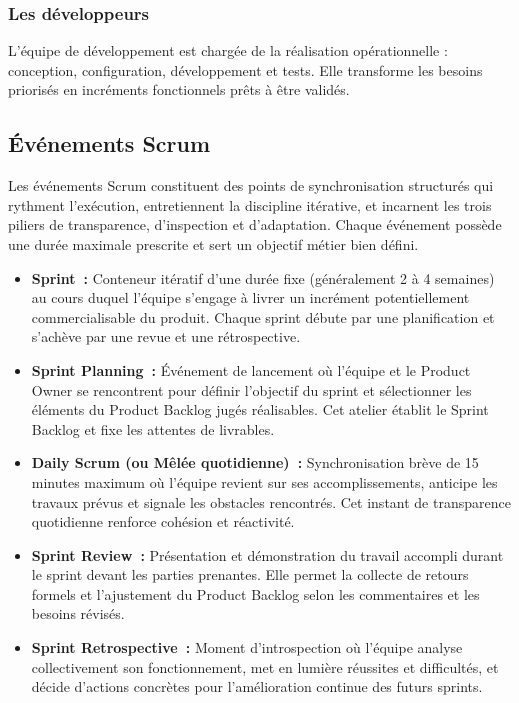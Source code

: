 \subsubsection{Les développeurs}
L’équipe de développement est chargée de la réalisation opérationnelle : conception, configuration,
développement et tests. Elle transforme les besoins priorisés en incréments fonctionnels prêts à être validés.

\subsection{Événements Scrum}
Les événements Scrum constituent des points de synchronisation structurés qui rythment l'exécution, entretiennent la discipline itérative, et incarnent les trois piliers de transparence, d'inspection et d'adaptation. Chaque événement possède une durée maximale prescrite et sert un objectif métier bien défini.
\begin{itemize}[nosep, left=0pt, label=\textbullet]
\item \textbf{Sprint~:} Conteneur itératif d'une durée fixe (généralement 2 à 4 semaines) au cours duquel l'équipe s'engage à livrer un incrément potentiellement commercialisable du produit. Chaque sprint débute par une planification et s'achève par une revue et une rétrospective.
\item \textbf{Sprint Planning~:} Événement de lancement où l'équipe et le Product Owner se rencontrent pour définir l'objectif du sprint et sélectionner les éléments du Product Backlog jugés réalisables. Cet atelier établit le Sprint Backlog et fixe les attentes de livrables.
\item \textbf{Daily Scrum (ou Mêlée quotidienne)~:} Synchronisation brève de 15 minutes maximum où l'équipe revient sur ses accomplissements, anticipe les travaux prévus et signale les obstacles rencontrés. Cet instant de transparence quotidienne renforce cohésion et réactivité.
\item \textbf{Sprint Review~:} Présentation et démonstration du travail accompli durant le sprint devant les parties prenantes. Elle permet la collecte de retours formels et l'ajustement du Product Backlog selon les commentaires et les besoins révisés.
\item \textbf{Sprint Retrospective~:} Moment d'introspection où l'équipe analyse collectivement son fonctionnement, met en lumière réussites et difficultés, et décide d'actions concrètes pour l'amélioration continue des futurs sprints.
\end{itemize}

